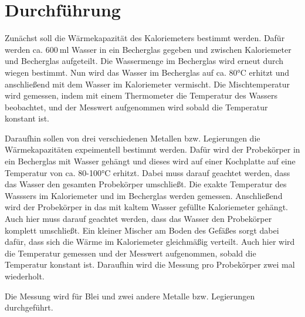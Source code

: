 \section{Durchführung}
\label{sec:Durchführung}

Zunächst soll die Wärmekapazität des Kaloriemeters bestimmt werden. Dafür werden ca.
$\SI{600}{\milli\litre}$ Wasser in ein Becherglas gegeben und zwischen Kaloriemeter
und Becherglas aufgeteilt. Die Wassermenge im Becherglas wird erneut durch wiegen
bestimmt. Nun wird das Wasser im Becherglas auf ca. 80°C erhitzt und anschließend
mit dem Wasser im Kaloriemeter vermischt. Die Mischtemperatur wird gemessen, indem
mit einem Thermometer die Temperatur des Wassers beobachtet, und der Messwert aufgenommen
wird sobald die Temperatur konstant ist.

Daraufhin sollen von drei verschiedenen Metallen bzw. Legierungen die Wärmekapazitäten
expeimentell bestimmt werden. Dafür wird der Probekörper in ein Becherglas mit
Wasser gehängt und dieses wird auf einer Kochplatte auf eine Temperatur von ca. 80-100°C erhitzt. Dabei muss
darauf geachtet werden, dass das Wasser den gesamten Probekörper umschließt. Die
exakte Temperatur des Wasssers im Kaloriemeter und im Becherglas werden gemessen.
Anschließend wird der Probekörper in das mit kaltem Wasser gefüllte Kaloriemeter gehängt. Auch
hier muss darauf geachtet werden, dass das Wasser den Probekörper komplett umschließt. Ein
kleiner Mischer am Boden des Gefäßes sorgt dabei dafür, dass sich die Wärme im Kaloriemeter
gleichmäßig verteilt. Auch hier wird die Temperatur gemessen und der Messwert aufgenommen,
sobald die Temperatur konstant ist. Daraufhin wird die Messung pro Probekörper zwei mal
wiederholt.

Die Messung wird für Blei und zwei andere Metalle bzw. Legierungen durchgeführt.
